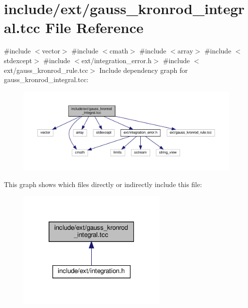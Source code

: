 \hypertarget{gauss__kronrod__integral_8tcc}{}\section{include/ext/gauss\+\_\+kronrod\+\_\+integral.tcc File Reference}
\label{gauss__kronrod__integral_8tcc}
{\ttfamily \#include $<$vector$>$}\newline
{\ttfamily \#include $<$cmath$>$}\newline
{\ttfamily \#include $<$array$>$}\newline
{\ttfamily \#include $<$stdexcept$>$}\newline
{\ttfamily \#include $<$ext/integration\+\_\+error.\+h$>$}\newline
{\ttfamily \#include $<$ext/gauss\+\_\+kronrod\+\_\+rule.\+tcc$>$}\newline
Include dependency graph for gauss\+\_\+kronrod\+\_\+integral.\+tcc\+:
\nopagebreak
\begin{figure}[H]
\begin{center}
\leavevmode
\includegraphics[width=350pt]{gauss__kronrod__integral_8tcc__incl}
\end{center}
\end{figure}
This graph shows which files directly or indirectly include this file\+:
\nopagebreak
\begin{figure}[H]
\begin{center}
\leavevmode
\includegraphics[width=211pt]{gauss__kronrod__integral_8tcc__dep__incl}
\end{center}
\end{figure}
